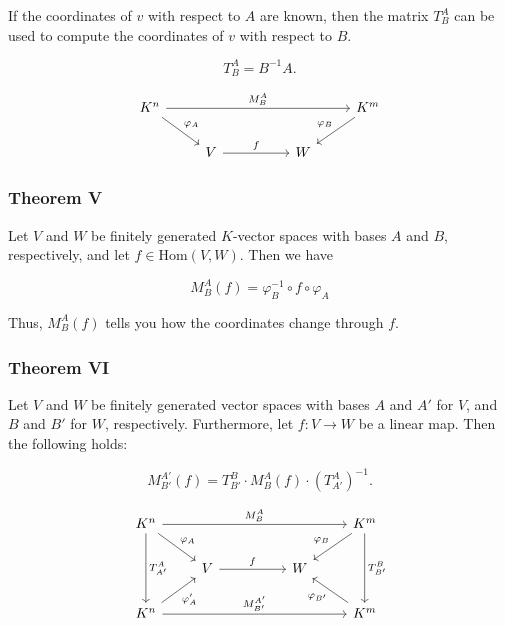 If the coordinates of \( v \) with respect to \(A\) are known, then the matrix \( T_B^A \) can be used to compute the coordinates of \( v \) with respect to \(B\).

\[ 
    T_B^A = B^{-1}A. 
\]

\[
    \begin{tikzcd}
        K^n \arrow[rrrr, "M_{B}^{A}"] \arrow[rd, "\varphi_A"] &                   &  &   & K^m \arrow[ld, "\varphi_B"'] \\
                                                              & V \arrow[rr, "f"] &  & W &                             
        \end{tikzcd}
\]

\subsubsection{Theorem V}
 
Let \( V \) and \( W \) be finitely generated \( K \)-vector spaces with 
bases \(A\) and \(B\), respectively, and let \( f \in \mathrm{Hom}(V, W) \).
Then we have

\[
    M_B^A(f) = \varphi_B^{-1} \circ f \circ \varphi_A
\]

Thus, \( M_B^A(f) \) tells you how the coordinates change through \(f\).

\subsubsection{Theorem VI} 

Let \( V \) and \( W \) be finitely generated vector spaces with bases \(A\) and \( A' \) 
for \( V \), and \(B\) and \( B' \) for \( W \), respectively.  Furthermore, let \( f: V \to W \) be 
a linear map. Then the following holds:

\[
    M_{B'}^{A'}(f) = T_{B'}^{B} \cdot M_{B}^{A}(f) \cdot {\left( T_{A'}^{A} \right)}^{-1}.
\]

\[
    \begin{tikzcd}
        K^n \arrow[dd, "T_{A'}^{A}"] \arrow[rrrr, "M_{B}^{A}"] \arrow[rd, "\varphi_A"] &                   &  &   & K^m \arrow[dd, "T_{B'}^{B}"] \arrow[ld, "\varphi_B"'] \\
                                                                                       & V \arrow[rr, "f"] &  & W &                                                       \\
        K^n \arrow[rrrr, "M_{B'}^{A'}"] \arrow[ru, "\varphi_{A}'"']                    &                   &  &   & K^m \arrow[lu, "\varphi_{B'}"]                       
    \end{tikzcd}
\]

